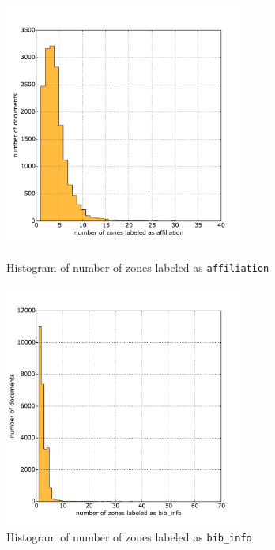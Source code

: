 \begin{figure}
\centering
\begin{minipage}[t!]{0.48\linewidth}
  \includegraphics[width=8cm]{plots/affiliation_histogram}
  \caption{Histogram of number of zones labeled as \texttt{affiliation}}
  \label{fig:affiliation_histogram}
\end{minipage}
\quad
\begin{minipage}[t!]{0.48\linewidth}
  \includegraphics[width=8cm]{plots/bib_info_histogram}
  \caption{Histogram of number of zones labeled as \texttt{bib\_info}}
  \label{fig:bib_info_histogram}
\end{minipage}
\end{figure}


